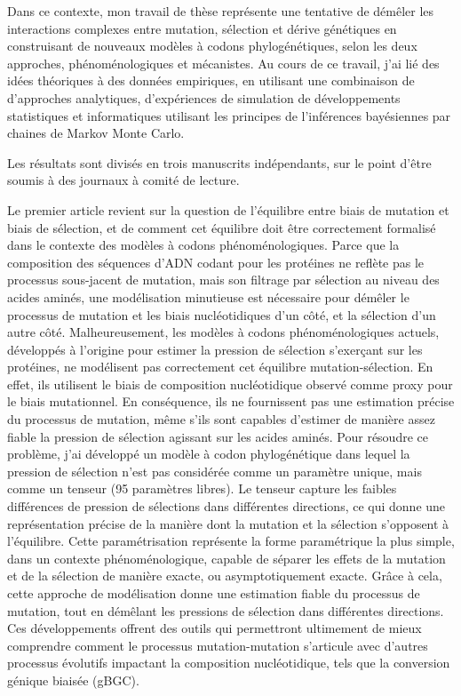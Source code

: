 Dans ce contexte, mon travail de thèse représente une tentative de démêler les interactions complexes entre mutation, sélection et dérive génétiques en construisant de nouveaux modèles à codons phylogénétiques, selon les deux approches, phénoménologiques et mécanistes.
Au cours de ce travail, j'ai lié des idées théoriques à des données empiriques, en utilisant une combinaison de d'approches analytiques, d'expériences de simulation de développements statistiques et informatiques utilisant les principes de l’inférences bayésiennes par chaines de Markov Monte Carlo.

Les résultats sont divisés en trois manuscrits indépendants, sur le point d'être soumis à des journaux à comité de lecture.

Le premier article revient sur la question de l'équilibre entre biais de mutation et biais de sélection, et de comment cet équilibre doit être correctement formalisé dans le contexte des modèles à codons phénoménologiques.
Parce que la composition des séquences d'ADN codant pour les protéines ne reflète pas le processus sous-jacent de mutation, mais son filtrage par sélection au niveau des acides aminés, une modélisation minutieuse est nécessaire pour démêler le processus de mutation et les biais nucléotidiques d'un côté, et la sélection d'un autre côté.
Malheureusement, les modèles à codons phénoménologiques actuels, développés à l'origine pour estimer la pression de sélection s’exerçant sur les protéines, ne modélisent pas correctement cet équilibre mutation-sélection.
En effet, ils utilisent le biais de composition nucléotidique observé comme proxy pour le biais mutationnel.
En conséquence, ils ne fournissent pas une estimation précise du processus de mutation, même s'ils sont capables d'estimer de manière assez fiable la pression de sélection agissant sur les acides aminés.
Pour résoudre ce problème, j'ai développé un modèle à codon phylogénétique dans lequel la pression de sélection n'est pas considérée comme un paramètre unique, mais comme un tenseur (95 paramètres libres).
Le tenseur capture les faibles différences de pression de sélections dans différentes directions, ce qui donne une représentation précise de la manière dont la mutation et la sélection s'opposent à l'équilibre.
Cette paramétrisation représente la forme paramétrique la plus simple, dans un contexte phénoménologique, capable de séparer les effets de la mutation et de la sélection de manière exacte, ou asymptotiquement exacte.
Grâce à cela, cette approche de modélisation donne une estimation fiable du processus de mutation, tout en démêlant les pressions de sélection dans différentes directions.
Ces développements offrent des outils qui permettront ultimement de mieux comprendre comment le processus mutation-mutation s’articule avec d'autres processus évolutifs impactant la composition nucléotidique, tels que la conversion génique biaisée (gBGC).


